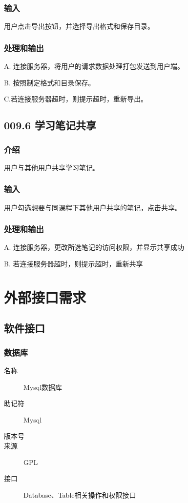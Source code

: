     \subsubsection{输入}
	用户点击导出按钮，并选择导出格式和保存目录。
    \subsubsection{处理和输出}
	A. 连接服务器，将用户的请求数据处理打包发送到用户端。
	
	B. 按照制定格式和目录保存。
	
	C.若连接服务器超时，则提示超时，重新导出。

 \subsection{009.6 学习笔记共享}
    \subsubsection{介绍}
	用户与其他用户共享学习笔记。
    \subsubsection{输入}
	用户勾选想要与同课程下其他用户共享的笔记，点击共享。
    \subsubsection{处理和输出}
	A. 连接服务器，更改所选笔记的访问权限，并显示共享成功

	B. 若连接服务器超时，则提示超时，重新共享

\section{外部接口需求}
  \subsection{软件接口}

    \subsubsection{数据库}
	\begin{center}\begin{description}
      \item[名称] Mysql数据库
      \item[助记符] Mysql
      \item[版本号] 
	\item[来源] GPL
	\item[接口] Database、Table相关操作和权限接口
	\end{description}\end{center}


